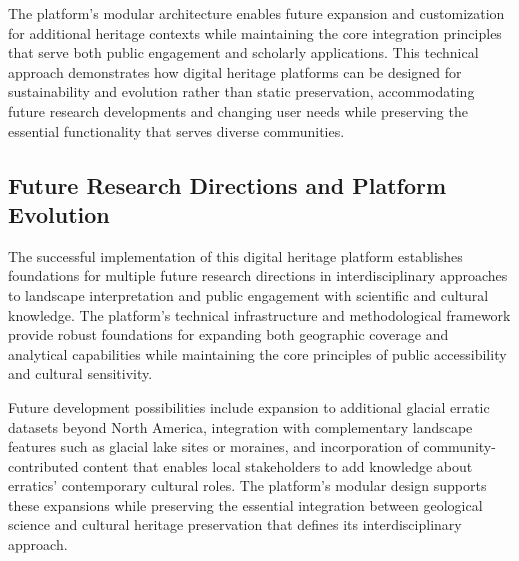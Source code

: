 The platform's modular architecture enables future expansion and customization for additional heritage contexts while maintaining the core integration principles that serve both public engagement and scholarly applications. This technical approach demonstrates how digital heritage platforms can be designed for sustainability and evolution rather than static preservation, accommodating future research developments and changing user needs while preserving the essential functionality that serves diverse communities.

\subsection{Future Research Directions and Platform Evolution}
\label{subsec:future_directions}

The successful implementation of this digital heritage platform establishes foundations for multiple future research directions in interdisciplinary approaches to landscape interpretation and public engagement with scientific and cultural knowledge. The platform's technical infrastructure and methodological framework provide robust foundations for expanding both geographic coverage and analytical capabilities while maintaining the core principles of public accessibility and cultural sensitivity.

Future development possibilities include expansion to additional glacial erratic datasets beyond North America, integration with complementary landscape features such as glacial lake sites or moraines, and incorporation of community-contributed content that enables local stakeholders to add knowledge about erratics' contemporary cultural roles. The platform's modular design supports these expansions while preserving the essential integration between geological science and cultural heritage preservation that defines its interdisciplinary approach.


